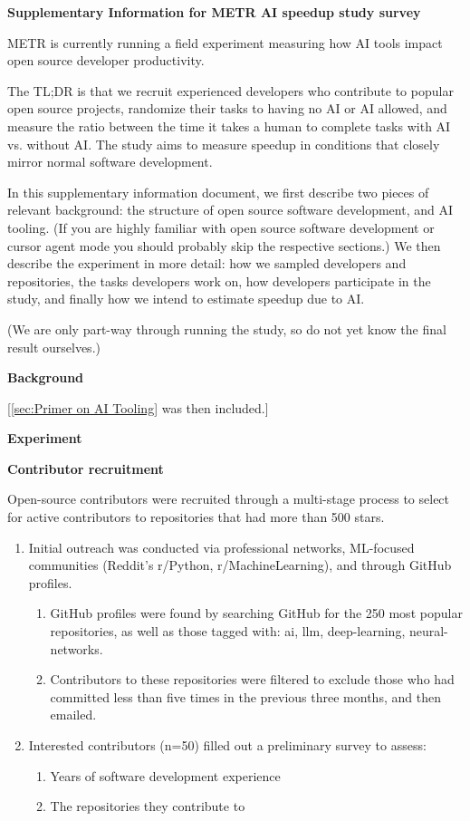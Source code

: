 \documentclass{article}
\begin{document}
\begin{instructionbox}

\textbf{Supplementary Information for METR AI speedup study survey}

METR is currently running a field experiment measuring how AI tools impact open source developer productivity.

The TL;DR is that we recruit experienced developers who contribute to popular open source projects, randomize their tasks to having no AI or AI allowed, and measure the ratio between the time it takes a human to complete tasks with AI vs. without AI. The study aims to measure speedup in conditions that closely mirror normal software development.

In this supplementary information document, we first describe two pieces of relevant background: the structure of open source software development, and AI tooling. (If you are highly familiar with open source software development or cursor agent mode you should probably skip the respective sections.) We then describe the experiment in more detail: how we sampled developers and repositories, the tasks developers work on, how developers participate in the study, and finally how we intend to estimate speedup due to AI.

(We are only part-way through running the study, so do not yet know the final result ourselves.)

\textbf{Background}

[\autoref{sec:Primer on AI Tooling} was then included.]

\textbf{Experiment}

\textbf{Contributor recruitment}

Open-source contributors were recruited through a multi-stage process to select for active contributors to repositories that had more than 500 stars.

\begin{enumerate}
    \item Initial outreach was conducted via professional networks, ML-focused communities (Reddit’s r/Python, r/MachineLearning), and through GitHub profiles.
    \begin{enumerate}
        \item GitHub profiles were found by searching GitHub for the 250 most popular repositories, as well as those tagged with: ai, llm, deep-learning, neural-networks. 
        \item Contributors to these repositories were filtered to exclude those who had committed less than five times in the previous three months, and then emailed.
    \end{enumerate}
    \item Interested contributors (n=50) filled out a preliminary survey to assess:
    \begin{enumerate}
        \item Years of software development experience
        \item The repositories they contribute to
    \end{enumerate}
\end{enumerate}


\end{instructionbox}
\end{document}
